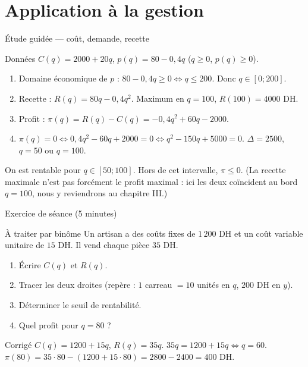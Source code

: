 \documentclass[10pt,aspectratio=169]{beamer}
\numberwithin{dummy}{section}
\newcommand{\CT}{C}
\newcommand{\Rec}{R}
\newcommand{\Prof}{\pi}
\begin{document}
\section{Application à la gestion}

\begin{frame}{Étude guidée --- coût, demande, recette}
\begin{block}{Données}
$\CT(q)=2000+20q$, \quad $p(q)=80-0{,}4q$ \quad ($q\geqslant 0$, $p(q)\geqslant 0$).
\end{block}

\begin{enumerate}\setlength{\itemsep}{0.45em}
    \item Domaine économique de $p$ : $80-0{,}4q\geqslant 0 \iff q\leqslant 200$.
    Donc $q\in[0;200]$.
    \item Recette : $\Rec(q)=80q-0{,}4q^2$. Maximum en $q=100$, $\Rec(100)=4000$ DH.
    \item Profit : $\Prof(q)=\Rec(q)-\CT(q)=-0{,}4q^2+60q-2000$.
    \item $\Prof(q)=0 \iff 0{,}4q^2-60q+2000=0 \iff q^2-150q+5000=0$.
    $\Delta=2500$, $q=50$ ou $q=100$.
\end{enumerate}

\vspace{0.2em}
\begin{boxsynthese}
On est rentable pour $q\in[50;100]$. Hors de cet intervalle, $\Prof\leqslant 0$.
(La recette maximale n'est pas forcément le profit maximal : ici les deux
coïncident au bord $q=100$, nous y reviendrons au chapitre III.)
\end{boxsynthese}
\end{frame}

\begin{frame}{Exercice de séance (5 minutes)}
\begin{alertblock}{À traiter par binôme}
Un artisan a des coûts fixes de $1\,200$ DH et un coût variable unitaire de $15$ DH.
Il vend chaque pièce $35$ DH.
\begin{enumerate}
    \item Écrire $\CT(q)$ et $\Rec(q)$.
    \item Tracer les deux droites (repère : $1$ carreau $=10$ unités en $q$, $200$ DH en $y$).
    \item Déterminer le seuil de rentabilité.
    \item Quel profit pour $q=80$ ?
\end{enumerate}
\end{alertblock}

\pause
\vspace{0.3em}
\begin{block}{Corrigé}
$\CT(q)=1200+15q$, $\Rec(q)=35q$.
$35q=1200+15q \iff q=60$.
$\Prof(80)=35\cdot 80-(1200+15\cdot 80)=2800-2400=400$ DH.
\end{block}
\end{frame}
\end{document}
